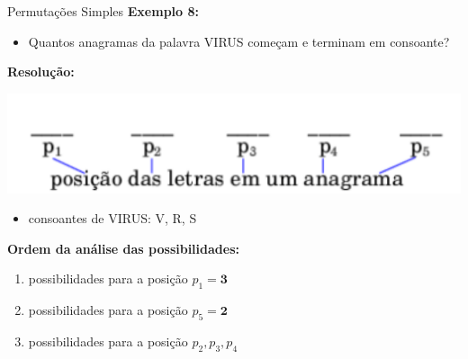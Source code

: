 \documentclass[aspectratio=169]{beamer}
\begin{document}
\begin{frame}{Permutações Simples}
    \textbf{Exemplo 8:}

    \vspace{2mm}

    \begin{itemize}
        \item[] Quantos anagramas da palavra VIRUS começam e terminam em consoante?
    \end{itemize}

    \textbf{Resolução:}

    \begin{center}
        \includegraphics[width=0.5\linewidth]{figs/Exemplo8_2.png}
    \end{center}

    
    \begin{itemize}
        \item consoantes de VIRUS: V, R, S
    \end{itemize}

    
    \textbf{Ordem da análise das possibilidades:}
    \begin{enumerate}[1)]
        \item possibilidades para a posição $p_1 = \boldsymbol{3}$ 
        \item possibilidades para a posição $p_5 = \boldsymbol{2}$ 
        \item possibilidades para a posição $p_2, p_3, p_4$
    \end{enumerate}

\end{frame}
\end{document}
